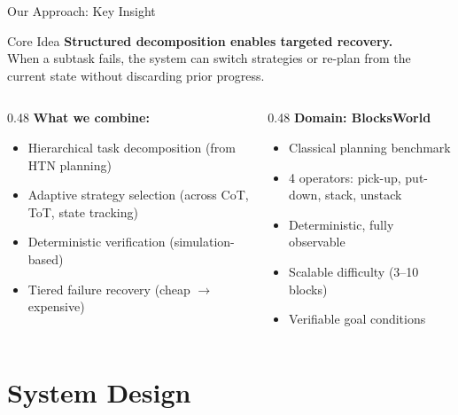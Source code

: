 \documentclass[aspectratio=169]{beamer}
\begin{document}
\begin{frame}{Our Approach: Key Insight}

\begin{block}{Core Idea}
\textbf{Structured decomposition enables targeted recovery.} \\
When a subtask fails, the system can switch strategies or re-plan from the current state without discarding prior progress.
\end{block}

\vspace{0.5cm}
\begin{columns}[T]
\begin{column}{0.48\textwidth}
\textbf{What we combine:}
\begin{itemize}
    \item Hierarchical task decomposition (from HTN planning)
    \item Adaptive strategy selection (across CoT, ToT, state tracking)
    \item Deterministic verification (simulation-based)
    \item Tiered failure recovery (cheap $\rightarrow$ expensive)
\end{itemize}
\end{column}
\begin{column}{0.48\textwidth}
\textbf{Domain: BlocksWorld}
\begin{itemize}
    \item Classical planning benchmark
    \item 4 operators: pick-up, put-down, stack, unstack
    \item Deterministic, fully observable
    \item Scalable difficulty (3--10 blocks)
    \item Verifiable goal conditions
\end{itemize}
\end{column}
\end{columns}

\end{frame}

\section{System Design}
\end{document}

